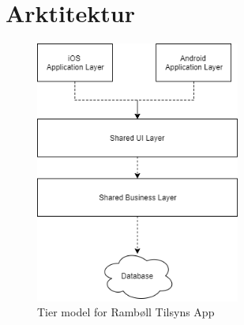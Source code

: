 \chapter{Arktitektur}



\begin{figure}[htbp] %
	\centering
	\includegraphics[width=0.6\textwidth]{../ArkitekturDesign/OverordnetArkitektur/SystemArkitektur.png}
	\caption{Tier model for Rambøll Tilsyns App}
	\label{fig:TierModel}
\end{figure}
\clearpage

